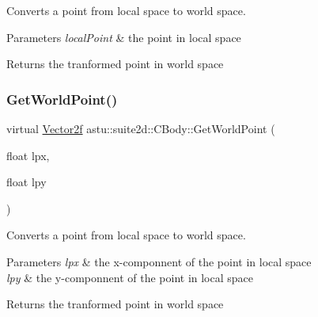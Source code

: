 Converts a point from local space to world space.


\begin{DoxyParams}{Parameters}
{\em local\+Point} & the point in local space \\
\hline
\end{DoxyParams}
\begin{DoxyReturn}{Returns}
the tranformed point in world space 
\end{DoxyReturn}
\mbox{\label{classastu_1_1suite2d_1_1CBody_a65c7a152ab2666e355bad3116c8f910b}} 
\subsubsection{\texorpdfstring{Get\+World\+Point()}{GetWorldPoint()}\hspace{0.1cm}{\footnotesize\ttfamily [2/2]}}
{\footnotesize\ttfamily virtual \hyperlink{classastu_1_1Vector2}{Vector2f} astu\+::suite2d\+::\+C\+Body\+::\+Get\+World\+Point (\begin{DoxyParamCaption}\item[{float}]{lpx,  }\item[{float}]{lpy }\end{DoxyParamCaption})\hspace{0.3cm}{\ttfamily [pure virtual]}}

Converts a point from local space to world space.


\begin{DoxyParams}{Parameters}
{\em lpx} & the x-\/componnent of the point in local space \\
\hline
{\em lpy} & the y-\/componnent of the point in local space \\
\hline
\end{DoxyParams}
\begin{DoxyReturn}{Returns}
the tranformed point in world space 
\end{DoxyReturn}
\mbox{\label{classastu_1_1suite2d_1_1CBody_a1ea8700e76d0c4f46aeb0c60bc0ea2c0}} 
